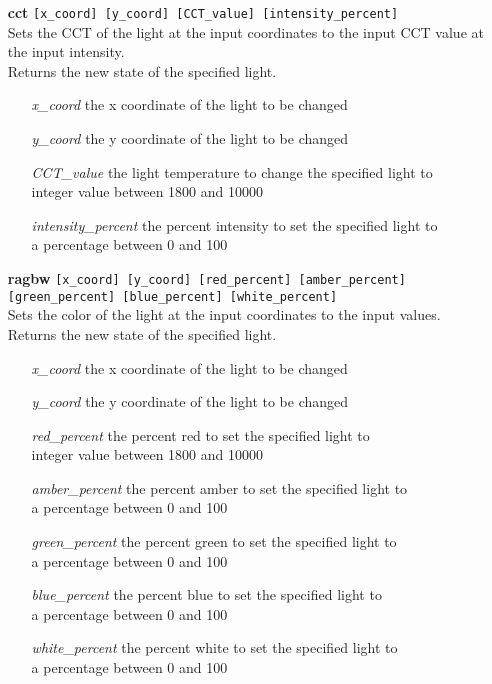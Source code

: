 \documentclass[twoside]{article}
\begin{document}
	\begin{enumerate}
		\item[\bf cct] \verb|[x_coord] [y_coord] [CCT_value] [intensity_percent]|\\
		Sets the CCT of the light at the input coordinates to the input CCT value at the input intensity.\\
		Returns the new state of the specified light.
		
		\begin{enumerate}[leftmargin=3\parindent]
			\item[{\it x\_coord}] the x coordinate of the light to be changed
			\item[{\it y\_coord}] the y coordinate of the light to be changed
			\item[{\it CCT\_value}] the light temperature to change the specified light to\\
			integer value between 1800 and 10000
			\item[{\it intensity\_percent}] the percent intensity to set the specified light to\\
			a percentage between 0 and 100
		\end{enumerate}
		
		\item[\bf ragbw] \verb|[x_coord] [y_coord] [red_percent] [amber_percent]|\\
						 \verb|[green_percent] [blue_percent] [white_percent]|\\
		Sets the color of the light at the input coordinates to the input values.\\
		Returns the new state of the specified light.
		
		\begin{enumerate}[leftmargin=3\parindent]
			\item[{\it x\_coord}] the x coordinate of the light to be changed
			\item[{\it y\_coord}] the y coordinate of the light to be changed
			\item[{\it red\_percent}] the percent red to set the specified light to\\
			integer value between 1800 and 10000
			\item[{\it amber\_percent}] the percent amber to set the specified light to\\
			a percentage between 0 and 100
			\item[{\it green\_percent}] the percent green to set the specified light to\\
			a percentage between 0 and 100
			\item[{\it blue\_percent}] the percent blue to set the specified light to\\
			a percentage between 0 and 100
			\item[{\it white\_percent}] the percent white to set the specified light to\\
			a percentage between 0 and 100
		\end{enumerate}
		

\end{enumerate}
\end{document}
